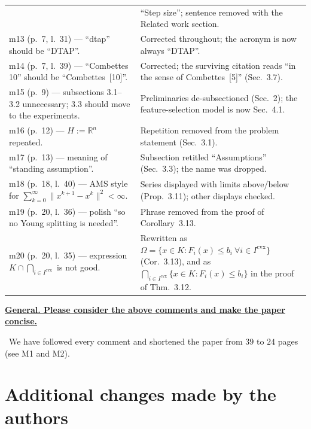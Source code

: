 \documentclass[11pt]{article}
\newcommand{\response}[1]{\smallskip\noindent{\color{blue!60!black}\textbf{Response.}}\ #1\par\medskip}
\newenvironment{point}[1]{\medskip\noindent\textbf{\uline{#1}}\par}{\par}
\begin{document}
{\begin{longtable}{@{}>{\raggedright\arraybackslash}p{}
                    >{\raggedright\arraybackslash}p{}@{}}
  & ``Step size''; sentence removed with the Related work section.\\
m13 (p.~7, l.~31) --- ``dtap'' should be ``DTAP''.
  & Corrected throughout; the acronym is now always ``DTAP''.\\
m14 (p.~7, l.~39) --- ``Combettes 10'' should be ``Combettes~[10]''.
  & Corrected; the surviving citation reads ``in the sense of Combettes~[5]'' (Sec.~3.7).\\
m15 (p.~9) --- subsections 3.1--3.2 unnecessary; 3.3 should move to the experiments.
  & Preliminaries de-subsectioned (Sec.~2); the feature-selection model is now Sec.~4.1.\\
m16 (p.~12) --- $H:=\mathbb{R}^n$ repeated.
  & Repetition removed from the problem statement (Sec.~3.1).\\
m17 (p.~13) --- meaning of ``standing assumption''.
  & Subsection retitled ``Assumptions'' (Sec.~3.3); the name was dropped.\\
m18 (p.~18, l.~40) --- AMS style for $\sum_{k=0}^{\infty}\lVert x^{k+1}-x^k\rVert^2<\infty$.
  & Series displayed with limits above/below (Prop.~3.11); other displays checked.\\
m19 (p.~20, l.~36) --- polish ``so no Young splitting is needed''.
  & Phrase removed from the proof of Corollary~3.13.\\
m20 (p.~20, l.~35) --- expression $K\cap\bigcap_{i\in I^{\mathrm{cvx}}}$ is not good.
  & Rewritten as $\Omega=\{x\in K:F_i(x)\le b_i\ \forall i\in I^{\mathrm{cvx}}\}$ (Cor.~3.13), and as $\bigcap_{i\in I^{\mathrm{cvx}}}\{x\in K:F_i(x)\le b_i\}$ in the proof of Thm.~3.12.\\
\end{longtable}}

\begin{point}{General. Please consider the above comments and make the paper concise.}
\response{We have followed every comment and shortened the paper from $39$ to $24$ pages
(see M1 and M2).}
\end{point}

\section*{Additional changes made by the authors}
\end{document}
